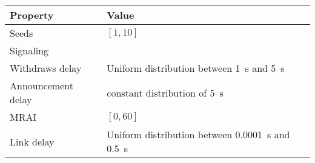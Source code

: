 \begin{center}
	\begin{tabular}{ || m{4cm}| m{8cm} || } 
	\hline
	Property & Value \\ 
	\hline \hline
	Seeds & $[1, 10]$ \\ 
	\hline
	Signaling & \q{AW} \\
	\hline
		Withdraws delay & Uniform distribution between \SI{1}{\second} and \SI{5}{\second} \\ 
	\hline
	Announcement delay & constant distribution of \SI{5}{\second} \\ 
	\hline
		MRAI & $[0, 60]$ \\
	\hline
	Link delay & Uniform distribution between \SI{0.0001}{\second} and \SI{0.5}{\second} \\
	\hline
	\end{tabular}
\end{center}
